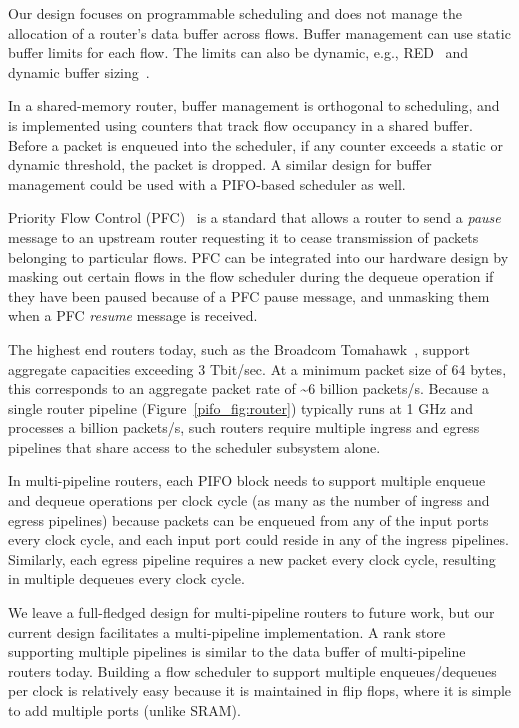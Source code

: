 Our design focuses on programmable scheduling and does not manage the allocation
of a router's data buffer across flows.  Buffer management can use
static buffer limits for each flow. The limits can also be dynamic, e.g.,
RED~\cite{red} and dynamic buffer sizing~\cite{broadcom_dynamic}.

In a shared-memory router, buffer management is orthogonal to scheduling,
and is implemented using counters that track flow occupancy in a shared
buffer. Before a packet is enqueued into the scheduler, if any counter
 exceeds a static or dynamic threshold, the packet is dropped. A similar
design for buffer management could be used with a PIFO-based scheduler as well.

Priority Flow Control (PFC)~\cite{pfc} is a standard that allows a router to
send a {\em pause} message to an upstream router requesting it to cease
transmission of packets belonging to particular flows. PFC can be integrated
into our hardware design by masking out certain flows in the flow scheduler
during the dequeue operation if they have been paused because of a PFC pause
message, and unmasking them when a PFC {\em resume} message is received.

The highest end routers today, such as the Broadcom Tomahawk~\cite{tomahawk},
support aggregate capacities exceeding 3 Tbit/sec. At a minimum packet size of
64 bytes, this corresponds to an aggregate packet rate of \textasciitilde6
billion packets/s. Because a single router pipeline
(Figure~\ref{pifo_fig:router}) typically runs at 1 GHz and processes a
billion packets/s, such routers require multiple ingress and egress pipelines
that share access to the scheduler subsystem alone.

In multi-pipeline routers, each PIFO block needs to support multiple enqueue
and dequeue operations per clock cycle (as many as the number of ingress and
egress pipelines) because packets can be enqueued from any of the input ports
every clock cycle, and each input port could reside in any of the ingress
pipelines. Similarly, each egress pipeline requires a new packet every clock
cycle, resulting in multiple dequeues every clock cycle.

We leave a full-fledged design for multi-pipeline routers to future work, but our
current design facilitates a multi-pipeline implementation. A rank store
supporting multiple pipelines is similar to the data buffer of multi-pipeline
routers today. Building a flow scheduler to support multiple enqueues/dequeues
per clock is relatively easy because it is maintained in flip flops, where it
is simple to add multiple ports (unlike SRAM).
